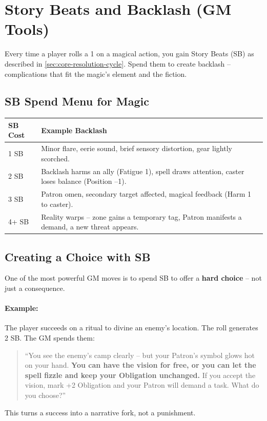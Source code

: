 \section{Story Beats and Backlash (GM Tools)}
\label{sec:story-beats-backlash}

Every time a player rolls a 1 on a magical action, you gain Story Beats (SB) as described in \ref{sec:core-resolution-cycle}. Spend them to create backlash -- complications that fit the magic's element and the fiction.

\subsection*{SB Spend Menu for Magic}
\begin{tcolorbox}[title=Spend SB on Magical Complications, colback=white!97!gray, colframe=black!80!gray,breakable]
\begin{tabularx}{\textwidth}{lX}
\toprule
\textbf{SB Cost} & \textbf{Example Backlash} \\
\midrule
1 SB & Minor flare, eerie sound, brief sensory distortion, gear lightly scorched. \\
2 SB & Backlash harms an ally (Fatigue 1), spell draws attention, caster loses balance (Position --1). \\
3 SB & Patron omen, secondary target affected, magical feedback (Harm 1 to caster). \\
4+ SB & Reality warps -- zone gains a temporary tag, Patron manifests a demand, a new threat appears. \\
\bottomrule
\end{tabularx}
\end{tcolorbox}

\subsection*{Creating a Choice with SB}
\label{subsec:sb-choice}
One of the most powerful GM moves is to spend SB to offer a \textbf{hard choice} -- not just a consequence.

\paragraph{Example:}
The player succeeds on a ritual to divine an enemy's location. The roll generates 2 SB. The GM spends them:
\begin{quote}
``You see the enemy's camp clearly -- but your Patron's symbol glows hot on your hand. \textbf{You can have the vision for free, or you can let the spell fizzle and keep your Obligation unchanged.} If you accept the vision, mark +2 Obligation and your Patron will demand a task. What do you choose?''
\end{quote}
This turns a success into a narrative fork, not a punishment.

